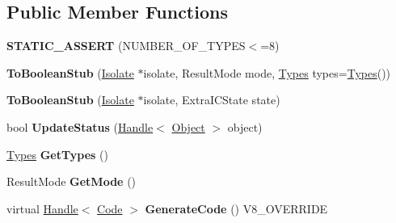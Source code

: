 \subsection*{Public Member Functions}
\begin{DoxyCompactItemize}
\item 
\hypertarget{classv8_1_1internal_1_1_to_boolean_stub_a5058280b2e84cee87373b1607ba53cab}{}{\bfseries S\+T\+A\+T\+I\+C\+\_\+\+A\+S\+S\+E\+R\+T} (N\+U\+M\+B\+E\+R\+\_\+\+O\+F\+\_\+\+T\+Y\+P\+E\+S$<$=8)\label{classv8_1_1internal_1_1_to_boolean_stub_a5058280b2e84cee87373b1607ba53cab}

\item 
\hypertarget{classv8_1_1internal_1_1_to_boolean_stub_aef6e187213b07dac06ef6b048900b9ae}{}{\bfseries To\+Boolean\+Stub} (\hyperlink{classv8_1_1internal_1_1_isolate}{Isolate} $\ast$isolate, Result\+Mode mode, \hyperlink{classv8_1_1internal_1_1_to_boolean_stub_1_1_types}{Types} types=\hyperlink{classv8_1_1internal_1_1_to_boolean_stub_1_1_types}{Types}())\label{classv8_1_1internal_1_1_to_boolean_stub_aef6e187213b07dac06ef6b048900b9ae}

\item 
\hypertarget{classv8_1_1internal_1_1_to_boolean_stub_ae0428c4d5c43c32314f1a24643e15de1}{}{\bfseries To\+Boolean\+Stub} (\hyperlink{classv8_1_1internal_1_1_isolate}{Isolate} $\ast$isolate, Extra\+I\+C\+State state)\label{classv8_1_1internal_1_1_to_boolean_stub_ae0428c4d5c43c32314f1a24643e15de1}

\item 
\hypertarget{classv8_1_1internal_1_1_to_boolean_stub_aff87a0d3d73b5f6e800bcb057079a75f}{}bool {\bfseries Update\+Status} (\hyperlink{classv8_1_1internal_1_1_handle}{Handle}$<$ \hyperlink{classv8_1_1internal_1_1_object}{Object} $>$ object)\label{classv8_1_1internal_1_1_to_boolean_stub_aff87a0d3d73b5f6e800bcb057079a75f}

\item 
\hypertarget{classv8_1_1internal_1_1_to_boolean_stub_a9c180d73e99b8e5a93b4095c8ac34090}{}\hyperlink{classv8_1_1internal_1_1_to_boolean_stub_1_1_types}{Types} {\bfseries Get\+Types} ()\label{classv8_1_1internal_1_1_to_boolean_stub_a9c180d73e99b8e5a93b4095c8ac34090}

\item 
\hypertarget{classv8_1_1internal_1_1_to_boolean_stub_a87a32eec3ecab2bbdfe64a9ebb590e05}{}Result\+Mode {\bfseries Get\+Mode} ()\label{classv8_1_1internal_1_1_to_boolean_stub_a87a32eec3ecab2bbdfe64a9ebb590e05}

\item 
\hypertarget{classv8_1_1internal_1_1_to_boolean_stub_a295e31e2ecaef0ed0ed1b717db46dec1}{}virtual \hyperlink{classv8_1_1internal_1_1_handle}{Handle}$<$ \hyperlink{classv8_1_1internal_1_1_code}{Code} $>$ {\bfseries Generate\+Code} () V8\+\_\+\+O\+V\+E\+R\+R\+I\+D\+E\label{classv8_1_1internal_1_1_to_boolean_stub_a295e31e2ecaef0ed0ed1b717db46dec1}


\end{DoxyCompactItemize}
